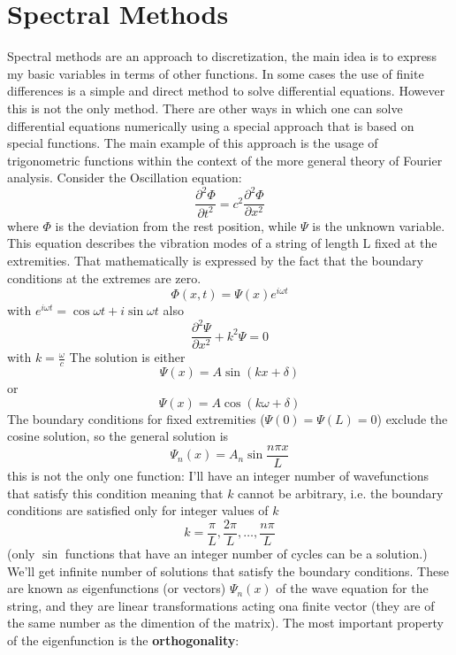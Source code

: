 \section{Spectral Methods}\label{sec:spectral method}
Spectral methods are an approach to discretization, the main idea is to express my basic variables in terms of other functions.
In some cases the use of finite differences is a simple and direct method to solve differential equations. However this is not the only method. There are other ways in which one can solve differential equations numerically using a special approach that is based on special functions. The main example of this approach is the usage of trigonometric functions within the context of the more general theory of Fourier analysis. Consider the Oscillation equation:
\begin{equation}\label{eq:oscillation}
	\frac{\partial^2\Phi}{\partial t^2}=c^2\frac{\partial^2\Phi}{\partial x^2}
\end{equation}
where $\Phi$ is the deviation from the rest position, while $\Psi$ is the unknown variable.
This equation describes the vibration modes of a string of length L fixed at the extremities. That mathematically is expressed by the fact that the boundary conditions at the extremes are zero.
\begin{equation}
	\Phi(x,t)=\Psi(x)e^{i\omega t}
\end{equation}
with $e^{i\omega t}=\cos \omega t+i\sin\omega t$
also
\begin{equation}
	\frac{\partial^2\Psi}{\partial x^2}+k^2\Psi=0
\end{equation} with $k=\frac{\omega}{c}$
The solution is either $$\Psi(x)=A\sin(kx+\delta)$$
or $$\Psi(x)=A\cos(k\omega+\delta)$$
The boundary conditions for fixed extremities ($\Psi(0)=\Psi(L)=0$) exclude the cosine solution, so the general solution is
\begin{equation}\label{psin}
	\Psi_n(x)=A_n\sin\frac{n\pi x}{L}
\end{equation}
this is not the only one function: I'll have an integer number of wavefunctions that satisfy this condition meaning that $k$ cannot be arbitrary, i.e. the boundary conditions are satisfied only for integer values of $k$
$$k=\frac{\pi}{L}, \frac{2\pi}{L}, \dots, \frac{n\pi}{L}$$
(only $\sin$ functions that have an integer number of cycles can be a solution.)  We'll get infinite number of solutions that satisfy the boundary conditions. These are known as eigenfunctions (or vectors) $\Psi_n(x)$ of the wave equation for the string, and they are linear transformations acting ona finite vector (they are of the same number as the dimention of the matrix). The most important property of the eigenfunction is the \textbf{orthogonality}:
